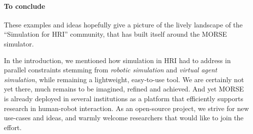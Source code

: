 \documentclass[conference]{IEEEtran}
\begin{document}
\paragraph*{To conclude}

These examples and ideas hopefully give a picture of the lively landscape of the
``Simulation for HRI'' community, that has built itself around the MORSE
simulator.

In the introduction, we mentioned how simulation in HRI had to address in
parallel constraints stemming from \emph{robotic simulation} and \emph{virtual
agent simulation}, while remaining a lightweight, easy-to-use tool. We are
certainly not yet there, much remains to be imagined, refined and achieved. And
yet MORSE is already deployed in several institutions as a platform that
efficiently supports research in human-robot interaction. As an open-source
project, we strive for new use-cases and ideas, and warmly welcome researchers
that would like to join the effort.






\end{document}
